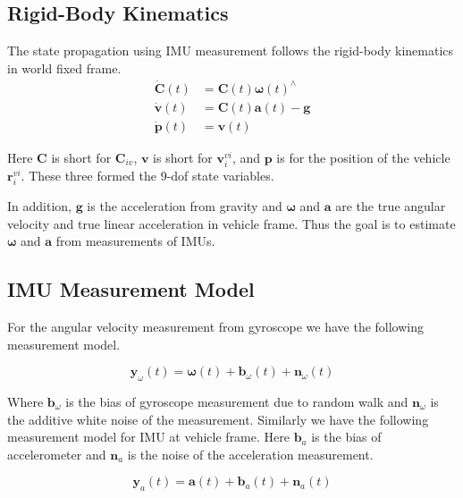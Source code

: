 \documentclass[conference]{IEEEtran}
\begin{document}
\subsection{Rigid-Body Kinematics}

The state propagation using IMU measurement follows the rigid-body kinematics in world fixed frame.
\begin{equation}
\begin{align}
    \dot{\textbf{C}}(t) &= \textbf{C}(t) \bm{\omega}(t)^\wedge \\
    \dot{\textbf{v}}(t) &= \textbf{C}(t) \textbf{a}(t) - \textbf{g} \\
    \dot{\textbf{p}}(t) &= \textbf{v}(t)
\end{align}
\end{equation}

Here $\textbf{C}$ is short for $\textbf{C}_{iv}$, $\textbf{v}$ is short for $\textbf{v}_i^{vi}$, and $\textbf{p}$ is for the position of the vehicle $\textbf{r}_i^{vi}$. These three formed the 9-dof state variables.

In addition, $\textbf{g}$ is the acceleration from gravity and $\bm{\omega}$ and $\textbf{a}$ are the true angular velocity and true linear acceleration in vehicle frame. Thus the goal is to estimate $\bm{\omega}$ and $\textbf{a}$ from measurements of IMUs.

\subsection{IMU Measurement Model}

For the angular velocity measurement from gyroscope we have the following measurement model.

\begin{equation}
    \textbf{y}_\omega(t) = \bm{\omega}(t) + \textbf{b}_\omega(t) + \textbf{n}_\omega(t)
\end{equation}

Where $\textbf{b}_\omega$ is the bias of gyroscope measurement due to random walk and $\textbf{n}_\omega$ is the additive white noise of the measurement. Similarly we have the following measurement model for IMU at vehicle frame. Here $\textbf{b}_a$ is the bias of accelerometer and $\textbf{n}_a$ is the noise of the acceleration measurement.

\begin{equation}
    \textbf{y}_a(t) = \textbf{a}(t) + \textbf{b}_a(t) + \textbf{n}_a(t)
\end{equation}
\end{document}
